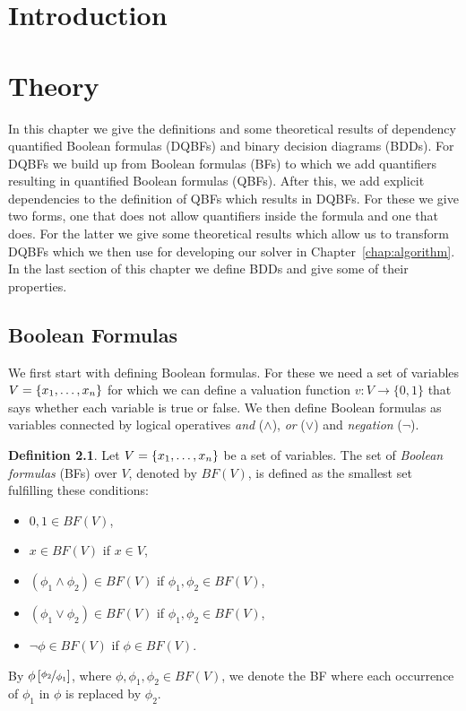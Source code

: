 \documentclass[
  digital, %
  twoside, %
  table,   %
  nolof,     %
  nolot,     %
]{fithesis3}
\let\setbuilder\set
\newcommand{\simpleset}[1]{\{{#1}\}}
\renewcommand{\set}[1]{\normalexpandarg\IfSubStr{#1}{|}{\setbuilder{#1}}{\simpleset{#1}}}
\theoremstyle{definition}
\newtheorem{definition}{Definition}
\theoremstyle{remark}
\newcommand{\substitute}[2]{\left[ \nicefrac{#2}{#1} \right]}
\newcommand{\BF}[1]{BF(#1)}
\begin{document}
\chapter{Introduction}

\chapter{Theory}
In this chapter we give the definitions and some theoretical results of dependency quantified Boolean formulas (DQBFs) and binary decision diagrams (BDDs). For DQBFs we build up from Boolean formulas (BFs) to which we add quantifiers resulting in quantified Boolean formulas (QBFs). After this, we add explicit dependencies to the definition of QBFs which results in DQBFs. For these we give two forms, one that does not allow quantifiers inside the formula and one that does. For the latter we give some theoretical results which allow us to transform DQBFs which we then use for developing our solver in Chapter~\ref{chap:algorithm}. In the last section of this chapter we define BDDs and give some of their properties.%


\section{Boolean Formulas}

We first start with defining Boolean formulas. For these we need a set of variables $V = \set{x_1, \dots, x_n}$ for which we can define a valuation function $v\colon V \to \{0,1\}$ that says whether each variable is true or false. We then define Boolean formulas as variables connected by logical operatives \emph{and} (${\land}$), \emph{or} (${\lor}$) and \emph{negation} (${\neg}$).

\begin{definition}
Let $V = \set{x_1, \dots, x_n}$ be a set of variables. The set of \emph{Boolean formulas} (BFs) over $V$, denoted by $\BF{V}$, is defined as the smallest set fulfilling these conditions:
\begin{itemize}
    \item $0,1 \in \BF{V}$,
    \item $x \in \BF{V}$ if $x \in V$,
    \item $(\phi_1 \land \phi_2) \in \BF{V}$ if $\phi_1, \phi_2 \in \BF{V}$,
    \item $(\phi_1 \lor \phi_2) \in \BF{V}$ if $\phi_1, \phi_2 \in \BF{V}$,
    \item $\neg\phi \in \BF{V}$ if $\phi \in \BF{V}$.
\end{itemize}
\end{definition}
By $\phi\substitute{\phi_1}{\phi_2}$, where $\phi,\phi_1,\phi_2 \in \BF{V}$, we denote the BF where each occurrence of $\phi_1$ in $\phi$ is replaced by $\phi_2$.
\end{document}
